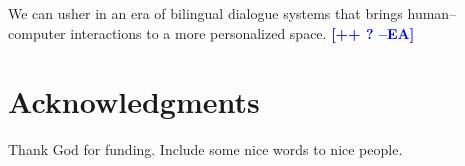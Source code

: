 \documentclass[11pt,a4paper]{article}
\newcommand{\ea}[1]{\textcolor{blue}{\bf\small [#1 --EA]}}
\begin{document}

We can usher in an era of bilingual dialogue systems that brings human--computer interactions to a more personalized space.
\ea{++ ?}



\iftaclfinal

\section{Acknowledgments}
Thank God for funding. Include some nice words to nice people.
\else
\fi



\end{document}

